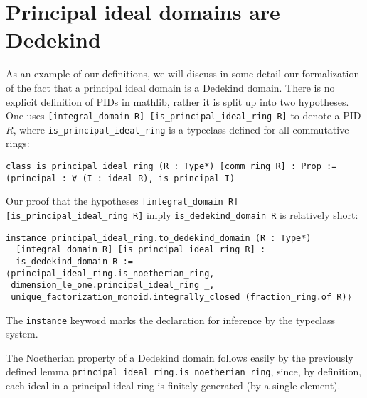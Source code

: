 \documentclass[a4paper,USenglish,cleveref, autoref, thm-restate]{lipics-v2021}
\newcommand{\lean}[1]{\texttt{#1}\xspace} %
\newcommand{\mathlib}{\textsf{mathlib}\xspace}
\begin{document}
\section{Principal ideal domains are Dedekind}

As an example of our definitions, we will discuss in some detail our formalization of the fact that a principal ideal domain is a Dedekind domain. There is no explicit definition of PIDs in \mathlib, rather it is split up into two hypotheses.
One uses \lean{[integral\_domain R] [is\_principal\_ideal\_ring R]} to denote a PID $R$,
where \lean{is\_principal\_ideal\_ring} is a typeclass defined for all commutative rings:
\begin{lstlisting}
class is_principal_ideal_ring (R : Type*) [comm_ring R] : Prop :=
(principal : ∀ (I : ideal R), is_principal I)
\end{lstlisting}

Our proof that the hypotheses \lean{[integral\_domain R] [is\_principal\_ideal\_ring R]} imply \lean{is\_dedekind\_domain R} is relatively short:
\begin{lstlisting}
instance principal_ideal_ring.to_dedekind_domain (R : Type*)
  [integral_domain R] [is_principal_ideal_ring R] :
  is_dedekind_domain R :=
⟨principal_ideal_ring.is_noetherian_ring,
 dimension_le_one.principal_ideal_ring _,
 unique_factorization_monoid.integrally_closed (fraction_ring.of R)⟩
\end{lstlisting}
The \lean{instance} keyword marks the declaration for inference by the typeclass system.

The Noetherian property of a Dedekind domain follows easily by the previously defined lemma \lean{principal\_ideal\_ring.is\_noetherian\_ring}, since, by definition, each ideal in a principal ideal ring is finitely generated (by a single element).
\end{document}
